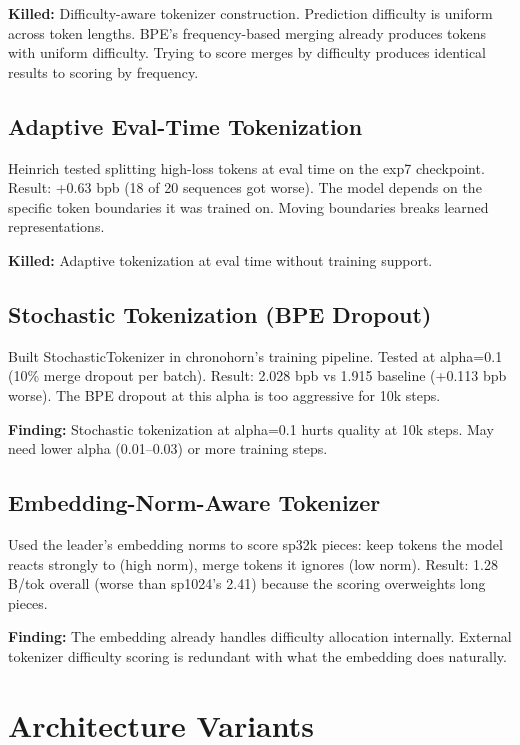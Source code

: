 \documentclass[11pt,a4paper]{report}
\newcommand{\finding}[1]{\textcolor{finding}{\textbf{Finding:}} #1}
\newcommand{\killed}[1]{\textcolor{killed}{\textbf{Killed:}} #1}
\begin{document}
\killed{Difficulty-aware tokenizer construction. Prediction difficulty is uniform across token lengths. BPE's frequency-based merging already produces tokens with uniform difficulty. Trying to score merges by difficulty produces identical results to scoring by frequency.}

\section{Adaptive Eval-Time Tokenization}

Heinrich tested splitting high-loss tokens at eval time on the exp7 checkpoint. Result: +0.63 bpb (18 of 20 sequences got worse). The model depends on the specific token boundaries it was trained on. Moving boundaries breaks learned representations.

\killed{Adaptive tokenization at eval time without training support.}

\section{Stochastic Tokenization (BPE Dropout)}

Built StochasticTokenizer in chronohorn's training pipeline. Tested at alpha=0.1 (10\% merge dropout per batch). Result: 2.028 bpb vs 1.915 baseline (+0.113 bpb worse). The BPE dropout at this alpha is too aggressive for 10k steps.

\finding{Stochastic tokenization at alpha=0.1 hurts quality at 10k steps. May need lower alpha (0.01--0.03) or more training steps.}

\section{Embedding-Norm-Aware Tokenizer}

Used the leader's embedding norms to score sp32k pieces: keep tokens the model reacts strongly to (high norm), merge tokens it ignores (low norm). Result: 1.28 B/tok overall (worse than sp1024's 2.41) because the scoring overweights long pieces.

\finding{The embedding already handles difficulty allocation internally. External tokenizer difficulty scoring is redundant with what the embedding does naturally.}


\chapter{Architecture Variants}
\end{document}
